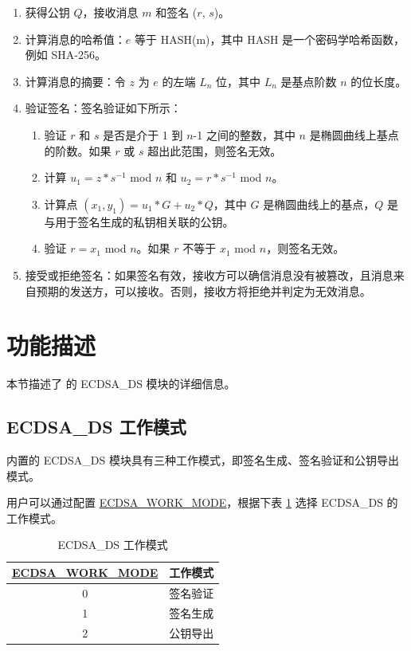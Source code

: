 \documentclass[main\_\_CN.tex]{subfiles}
\begin{document}
\begin{enumerate}
    \item 获得公钥 $Q$，接收消息 $m$ 和签名 ($r$, $s$)。
    \item 计算消息的哈希值：$e$ 等于 HASH(m)，其中 HASH 是一个密码学哈希函数，例如 SHA-256。
    \item 计算消息的摘要：令 $z$ 为 $e$ 的左端 $L_n$ 位，其中 $L_n$ 是基点阶数 $n$ 的位长度。
    \item 验证签名：签名验证如下所示：
        \begin{enumerate}
            \item 验证 $r$ 和 $s$ 是否是介于 1 到 $n$-1 之间的整数，其中 $n$ 是椭圆曲线上基点的阶数。如果 $r$ 或 $s$ 超出此范围，则签名无效。
            \item 计算 $u_1 = z * s^{-1}$ \textrm{mod} $n$ 和 $u_2 = r * s^{-1}$ \textrm{mod} $n$。
            \item 计算点 $(x_1, y_1) = u_1 * G + u_2 * Q$，其中 $G$ 是椭圆曲线上的基点，$Q$ 是与用于签名生成的私钥相关联的公钥。
            \item 验证 $r = x_1$ \textrm{mod} $n$。如果 $r$ 不等于 $x_1$ \textrm{mod} $n$，则签名无效。
        \end{enumerate}
    \item 接受或拒绝签名：如果签名有效，接收方可以确信消息没有被篡改，且消息来自预期的发送方，可以接收。否则，接收方将拒绝并判定为无效消息。
\end{enumerate}


\section{功能描述}

本节描述了 \chipname{} 的 ECDSA\_DS 模块的详细信息。

\subsection{ECDSA\_DS 工作模式}

\chipname{} 内置的 ECDSA\_DS 模块具有三种工作模式，即签名生成、签名验证和公钥导出模式。

用户可以通过配置 \hyperref[fielddesc:ECDSAWORKMODE]{ECDSA\_WORK\_MODE}，根据下表 \ref{tab:ecdsa-working-mode} 选择 ECDSA\_DS 的工作模式。

\begin{table}[H]
    \centering
    \caption{ECDSA\_DS 工作模式}
    \label{tab:ecdsa-working-mode}
    \begin{tabular}{ | c | l | }
    \hline
        \rowcolor{lightgray}
        \textbf{\hyperref[fielddesc:ECDSAWORKMODE]{ECDSA\_WORK\_MODE}}      & \textbf{工作模式}\\\hline
        0                       & 签名验证  \\\hline
        1                       & 签名生成     \\\hline
        2                       & 公钥导出         \\\hline
    \end{tabular}
\end{table}
\end{document}
